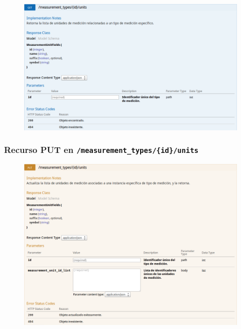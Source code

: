 \begin{figure}[h]
  \centering
  \includegraphics[width=\textwidth,height=.75\textheight,keepaspectratio]{img/especificacion_api/measurementTypeUnitsList_get}
  \label{measurementTypeUnitsList_get}
\end{figure}

\newpage


\subsubsection{Recurso PUT en \texttt{/measurement\_types/\{id\}/units}}

\begin{figure}[h]
  \centering
  \includegraphics[width=\textwidth,height=.75\textheight,keepaspectratio]{img/especificacion_api/measurementTypeUnitsList_put}
  \label{measurementTypeUnitsList_put}
\end{figure}

